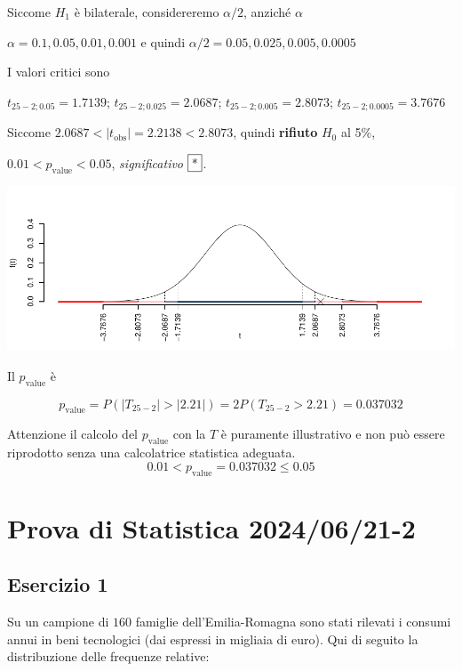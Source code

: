 \documentclass[
  11pt,
]{book}
\theoremstyle{mytheoremstyle}
\theoremstyle{mydefstyle}
\newenvironment{sol}
  {
  \begin{tcolorbox}[enhanced,breakable,arc=0.1mm,boxrule=1pt,colback=white,colframe=iblue,
  title=\bf \fontfamily{lmss}\selectfont \hspace{.5 cm} Soluzione,drop fuzzy shadow]

}{
\end{tcolorbox}
  }
\begin{document}
\begin{sol}
Siccome \(H_1\) è bilaterale, considereremo \(\alpha/2\),
anziché \(\alpha\)

\(\alpha=0.1, 0.05, 0.01, 0.001\) e quindi \(\alpha/2=0.05, 0.025, 0.005, 0.0005\)

I valori critici sono

\(t_{25-2;0.05}=1.7139\); \(t_{25-2;0.025}=2.0687\); \(t_{25-2;0.005}=2.8073\); \(t_{25-2;0.0005}=3.7676\)

Siccome \(2.0687<|t_\text{obs}|=2.2138<2.8073\), quindi \textbf{rifiuto} \(H_0\) al 5\%,

\(0.01<p_\text{value}<0.05\), \emph{significativo} \(\fbox{*}\).

\begin{center}\includegraphics{Esami_passati_con_soluzioni_files/figure-latex/2024-81-1} \end{center}

Il \(p_{\text{value}}\) è

\[ p_{\text{value}} = P(|T_{25-2}|>|2.21|)=2P(T_{25-2}>2.21)=0.037032 \]

Attenzione il calcolo del \(p_\text{value}\) con la \(T\) è puramente illustrativo e non può essere riprodotto senza una calcolatrice statistica adeguata.\[
 0.01 < p_\text{value}= 0.037032 \leq 0.05 
\]

\end{sol}

\section{Prova di Statistica 2024/06/21-2}\label{prova-di-statistica-20240621-2}

\subsection{Esercizio 1}\label{esercizio-1-38}

Su un campione di \(160\) famiglie dell'Emilia-Romagna sono stati rilevati i consumi annui in beni tecnologici (dai espressi in migliaia di euro). Qui di seguito la distribuzione delle frequenze relative:
\end{document}

